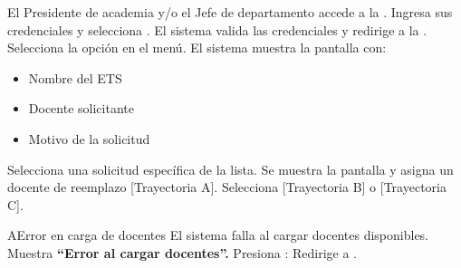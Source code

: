 \begin{UCtrayectoria}
	\UCpaso[\UCactor] El Presidente de academia y/o el Jefe de departamento accede a la .
	\UCpaso[\UCactor] Ingresa sus credenciales y selecciona .
	\UCpaso El sistema valida las credenciales y redirige a la .
	\UCpaso[\UCactor] Selecciona la opción  en el menú.
	\UCpaso El sistema muestra la pantalla  con:
	\begin{itemize}
		\item Nombre del ETS
		\item Docente solicitante
		\item Motivo de la solicitud
	\end{itemize} 
	\UCpaso[\UCactor] Selecciona una solicitud específica de la lista.
	\UCpaso[\UCactor] Se muestra la pantalla  y asigna un docente de reemplazo [Trayectoria A].
	\UCpaso[\UCactor] Selecciona  [Trayectoria B] o  [Trayectoria C].
\end{UCtrayectoria}
\begin{UCtrayectoriaA}{A}{Error en carga de docentes}
	\UCpaso El sistema falla al cargar docentes disponibles.
	\UCpaso Muestra \textbf{ ``Error al cargar docentes''.}
	\UCpaso[\UCactor] Presiona : Redirige a .
\end{UCtrayectoriaA}

